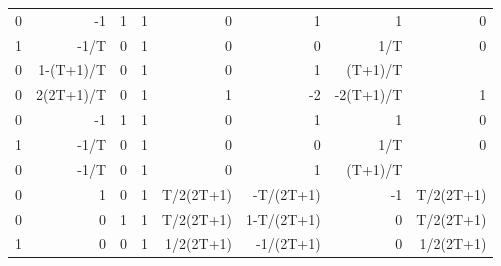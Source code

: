 \begin{table}[ht]
\begin{tabular}{rrrlrrrr}
        0      & -1         & 1  & 1  & 0                                                          & 1                                                          & 1                                                          & 0         \\
        1      & -1/T       & 0  & 1  & 0                                                          & 0                                                          & 1/T                                                        & 0         \\
        0      & 1-(T+1)/T  & 0  & 1  & 0                                                          & 1                                                          & (T+1)/T                                                    &           \\ \hline
        0      & 2(2T+1)/T  & 0  & 1  & 1                                                          & -2                                                         & -2(T+1)/T                                                  & 1         \\ \hline
        0      & -1         & 1  & 1  & 0                                                          & 1                                                          & 1                                                          & 0         \\
        1      & -1/T       & 0  & 1  & 0                                                          & 0                                                          & 1/T                                                        & 0         \\
        0      & -1/T       & 0  & 1  & 0                                                          & 1                                                          & (T+1)/T                                                    &           \\ \hline
        0      & 1          & 0  & 1  & T/2(2T+1)                                                  & -T/(2T+1)                                                  & -1                                                         & T/2(2T+1) \\ \hline
        0      & 0          & 1  & 1  & T/2(2T+1)                                                  & 1-T/(2T+1)                                                 & 0                                                          & T/2(2T+1) \\
        1      & 0          & 0  & 1  & 1/2(2T+1)                                                  & -1/(2T+1)                                                  & 0                                                          & 1/2(2T+1) \\ \hline

\end{tabular}
\end{table}
